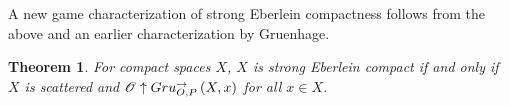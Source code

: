 \documentclass{amsart}
\newtheorem{theorem}{Theorem}[section]
\theoremstyle{definition}
\begin{document}
  A new game characterization of strong Eberlein compactness follows
  from the above and an earlier characterization by Gruenhage.

  \begin{theorem}
    For compact spaces \(X\),
    \(X\) is strong Eberlein compact if and only if
    \(X\) is scattered and \(\mathscr{O}\uparrow Gru_{O,P}^{\to}\left({X},{x}\right)\) for all \(x\in X\).
  \end{theorem}

\newpage







\end{document}
